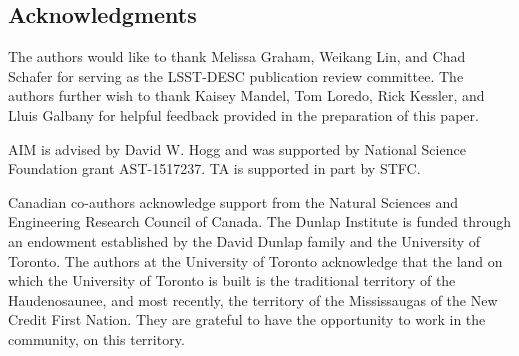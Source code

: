 \documentclass[\docopts]{\docclass}
\begin{document}













\subsection*{Acknowledgments}





The authors would like to thank Melissa Graham, Weikang Lin, and Chad Schafer for serving as the LSST-DESC publication review committee.
The authors further wish to thank Kaisey Mandel, Tom Loredo, Rick Kessler, and Lluis Galbany for helpful feedback provided in the preparation of this paper.

AIM is advised by David W. Hogg and was supported by National Science Foundation grant AST-1517237.
TA is supported in part by STFC.

Canadian co-authors acknowledge support from the Natural Sciences and Engineering Research Council of Canada.
The Dunlap Institute is funded through an endowment established by the David Dunlap family and the University of Toronto.
The authors at the University of Toronto acknowledge that the land on which the University of Toronto is built is the traditional territory of the Haudenosaunee, and most recently, the territory of the Mississaugas of the New Credit First Nation. They are grateful to have the opportunity to work in the community, on this territory.
\end{document}
